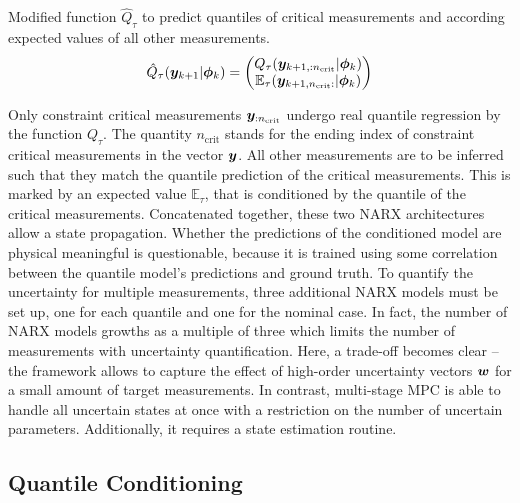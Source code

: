 \begin{definition} Modified function $\hat{Q}_\tau$ to predict quantiles of critical measurements and according expected values
    of all other measurements.
    \[
        \hat{Q}_\tau({\bm{y}}_{k+1} | \bm{\phi}_k) = 
        \begin{pmatrix}
            Q_\tau({\bm{y}}_{k+1, :n_\text{crit}} | \bm{\phi}_k) \\
            \mathbb{E}_{\tau}({\bm{y}}_{k+1, n_\text{crit}:} | \bm{\phi}_k)
        \end{pmatrix}
    \]
\end{definition}
\noindent
Only constraint critical measurements ${\bm{y}}_{:n_\text{crit}}$ undergo real quantile regression by the function $Q_\tau$.
The quantity $n_\text{crit}$ stands for the ending index of constraint critical measurements in the vector ${\bm{y}}$.
All other measurements are to be inferred such that they match the quantile prediction of the critical measurements. 
This is marked by an expected value $\mathbb{E}_\tau$, that is conditioned by the quantile of the critical measurements.
Concatenated together, these two NARX architectures allow a state propagation. Whether the predictions of the conditioned
model are physical meaningful is questionable, because it is trained using some correlation between the 
quantile model's predictions and ground truth.
To quantify the uncertainty for multiple measurements, 
three additional NARX models must be set up, one for each quantile and one for the nominal case.
In fact, the number of NARX models growths as a multiple of three which limits
the number of measurements with uncertainty quantification.
Here, a trade-off becomes clear – the framework allows to capture the effect of high-order uncertainty
vectors ${\bm{w}}$ for a small amount of target measurements. In contrast, multi-stage MPC
is able to handle all uncertain states at once with a restriction on the number of uncertain parameters.
Additionally, it requires a state estimation routine.

\subsection{Quantile Conditioning}

